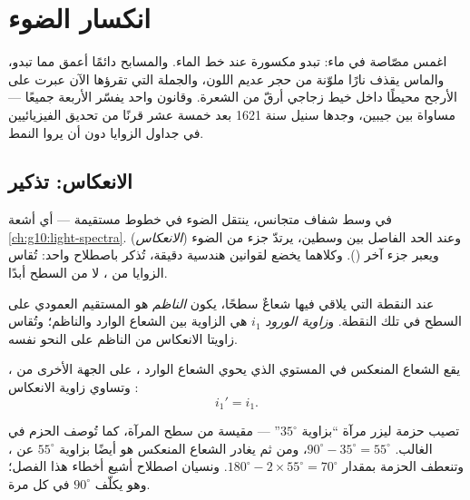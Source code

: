 \chapter{انكسار الضوء}\label{ch:g10:refraction}

اغمس مصّاصة في  ماء: تبدو مكسورة عند خط الماء.
والمسابح دائمًا أعمق مما تبدو، والماس يقذف نارًا ملوّنة من حجر
عديم اللون، والجملة التي تقرؤها الآن عبرت على الأرجح محيطًا داخل
خيط زجاجي أرقّ من الشعرة. وقانون واحد يفسّر الأربعة جميعًا --- مساواة
بين جيبين، وجدها سنيل سنة 1621 بعد خمسة عشر قرنًا من تحديق الفيزيائيين
في جداول الزوايا دون أن يروا النمط.

\section{الانعكاس: تذكير}

في وسط شفاف متجانس، ينتقل الضوء في خطوط مستقيمة ---
أي أشعة \cref{ch:g10:light-spectra}. وعند الحد الفاصل بين وسطين،
يرتدّ جزء من الضوء (\emph{الانعكاس}) ويعبر جزء آخر
(\emph{}). وكلاهما يخضع لقوانين هندسية دقيقة، تُذكر
باصطلاح واحد: تُقاس الزوايا من \emph{}، لا
من السطح أبدًا.

\begin{definition}\label{def:g10:refraction:angles}
عند النقطة التي يلاقي فيها شعاعٌ سطحًا، يكون
\emph{الناظم} هو المستقيم العمودي على السطح في
تلك النقطة. و\emph{زاوية الورود} $i_1$
هي الزاوية بين الشعاع الوارد والناظم؛ وتُقاس زاويتا
الانعكاس  من الناظم على النحو
نفسه.
\end{definition}

\begin{proposition}\label{prop:g10:refraction:reflection}
يقع الشعاع المنعكس في المستوي الذي يحوي الشعاع الوارد
، على الجهة الأخرى من ، وتساوي زاوية الانعكاس
:
\[
i_1' = i_1 .
\]
\end{proposition}
\admitted

\begin{example}\label{ex:g10:refraction:mirror}
تصيب حزمة ليزر مرآة ``بزاوية $35^\circ$'' --- مقيسة من
سطح المرآة، كما تُوصف الحزم في الغالب. 
$90^\circ - 35^\circ = 55^\circ$، ومن ثم يغادر الشعاع المنعكس هو أيضًا بزاوية
$55^\circ$ عن ، وتنعطف الحزمة بمقدار
$180^\circ - 2 \times 55^\circ = 70^\circ$. ونسيان اصطلاح
 أشيع أخطاء هذا الفصل؛ وهو يكلّف
$90^\circ$ في كل مرة.
\end{example}

